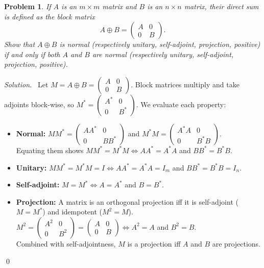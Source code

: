 \documentclass[12pt,a4paper]{article}
\newenvironment{solution}{%
  \par\noindent\textit{Solution.}\ }{\qed}
\theoremstyle{problemstyle}
\newtheorem{problem}{Problem}[section]
\begin{document}
\begin{problem}\label{prob:3-8}
If $A$ is an $m \times m$ matrix and $B$ is an $n \times n$ matrix, their \textit{direct sum} is defined as the block matrix
\[
A \oplus B = \begin{pmatrix} A & 0 \\ 0 & B \end{pmatrix}.
\]
Show that $A \oplus B$ is normal (respectively unitary, self-adjoint, projection, positive) if and only if both $A$ and $B$ are normal (respectively unitary, self-adjoint, projection, positive).
\end{problem}
\begin{solution}
    Let $M = A \oplus B = \begin{pmatrix} A & 0 \\ 0 & B \end{pmatrix}$. Block matrices multiply and take adjoints block-wise, so $M^* = \begin{pmatrix} A^* & 0 \\ 0 & B^* \end{pmatrix}$. We evaluate each property:

\begin{itemize}
    \item \textbf{Normal:} $M M^* = \begin{pmatrix} AA^* & 0 \\ 0 & BB^* \end{pmatrix}$ and $M^* M = \begin{pmatrix} A^*A & 0 \\ 0 & B^*B \end{pmatrix}$. \\
    Equating them shows $M M^* = M^* M \iff AA^* = A^*A$ and $BB^* = B^*B$.
    
    \item \textbf{Unitary:} $M M^* = M^* M = I \iff AA^* = A^*A = I_m$ and $BB^* = B^*B = I_n$.
    
    \item \textbf{Self-adjoint:} $M = M^* \iff A = A^*$ and $B = B^*$.
    
    \item \textbf{Projection:} A matrix is an orthogonal projection iff it is self-adjoint ($M=M^*$) and idempotent ($M^2=M$). \\
    $M^2 = \begin{pmatrix} A^2 & 0 \\ 0 & B^2 \end{pmatrix} = \begin{pmatrix} A & 0 \\ 0 & B \end{pmatrix} \iff A^2 = A$ and $B^2 = B$. \\
    Combined with self-adjointness, $M$ is a projection iff $A$ and $B$ are projections.
    

\end{itemize}
\end{solution}
\end{document}
